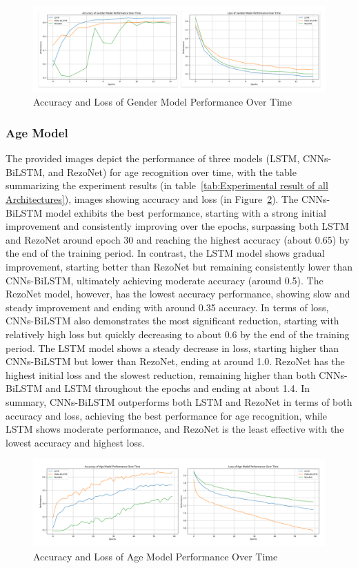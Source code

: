 \documentclass[conference, 10pt,onecolumn]{IEEEtran}
\begin{document}
\begin{figure}
    \centering
    \includegraphics[width=7 in]{Gender Model.pdf}
    \caption{Accuracy and Loss of Gender Model Performance Over Time}
    \label{fig:Gender_valid}
\end{figure}

\subsubsection{Age Model}
The provided images depict the performance of three models (LSTM, CNNs-BiLSTM, and RezoNet) for age recognition over time, with the  table summarizing the experiment results (in table~\ref{tab:Experimental result of all Architectures}), images showing accuracy and loss (in Figure~\ref{fig:Age_valid}). The CNNs-BiLSTM model exhibits the best performance, starting with a strong initial improvement and consistently improving over the epochs, surpassing both LSTM and RezoNet around epoch 30 and reaching the highest accuracy (about 0.65) by the end of the training period. In contrast, the LSTM model shows gradual improvement, starting better than RezoNet but remaining consistently lower than CNNs-BiLSTM, ultimately achieving moderate accuracy (around 0.5). The RezoNet model, however, has the lowest accuracy performance, showing slow and steady improvement and ending with around 0.35 accuracy. In terms of loss, CNNs-BiLSTM also demonstrates the most significant reduction, starting with relatively high loss but quickly decreasing to about 0.6 by the end of the training period. The LSTM model shows a steady decrease in loss, starting higher than CNNs-BiLSTM but lower than RezoNet, ending at around 1.0. RezoNet has the highest initial loss and the slowest reduction, remaining higher than both CNNs-BiLSTM and LSTM throughout the epochs and ending at about 1.4. In summary, CNNs-BiLSTM outperforms both LSTM and RezoNet in terms of both accuracy and loss, achieving the best performance for age recognition, while LSTM shows moderate performance, and RezoNet is the least effective with the lowest accuracy and highest loss.

\begin{figure}
    \centering
    \includegraphics[width=7 in]{Age Model.pdf}
    \caption{Accuracy and Loss of Age Model Performance Over Time}
    \label{fig:Age_valid}
\end{figure}
\end{document}
